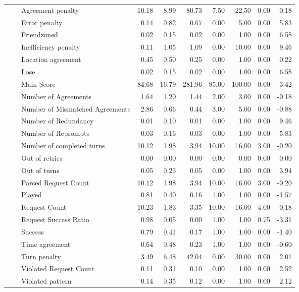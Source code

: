 \begin{tabular}{lllrrrrrrr}
 &  & Agreement penalty & 10.18 & 8.99 & 80.73 & 7.50 & 22.50 & 0.00 & 0.18 \\
 &  & Error penalty & 0.14 & 0.82 & 0.67 & 0.00 & 5.00 & 0.00 & 5.83 \\
 &  & Friendzoned & 0.02 & 0.15 & 0.02 & 0.00 & 1.00 & 0.00 & 6.58 \\
 &  & Inefficiency penalty & 0.11 & 1.05 & 1.09 & 0.00 & 10.00 & 0.00 & 9.46 \\
 &  & Location agreement & 0.45 & 0.50 & 0.25 & 0.00 & 1.00 & 0.00 & 0.22 \\
 &  & Lose & 0.02 & 0.15 & 0.02 & 0.00 & 1.00 & 0.00 & 6.58 \\
 &  & Main Score & 84.68 & 16.79 & 281.96 & 85.00 & 100.00 & 0.00 & -3.42 \\
 &  & Number of Agreements & 1.64 & 1.20 & 1.44 & 2.00 & 3.00 & 0.00 & -0.18 \\
 &  & Number of Mismatched Agreements & 2.86 & 0.66 & 0.44 & 3.00 & 5.00 & 0.00 & -0.88 \\
 &  & Number of Redundancy & 0.01 & 0.10 & 0.01 & 0.00 & 1.00 & 0.00 & 9.46 \\
 &  & Number of Reprompts & 0.03 & 0.16 & 0.03 & 0.00 & 1.00 & 0.00 & 5.83 \\
 &  & Number of completed turns & 10.12 & 1.98 & 3.94 & 10.00 & 16.00 & 3.00 & -0.20 \\
 &  & Out of retries & 0.00 & 0.00 & 0.00 & 0.00 & 0.00 & 0.00 & 0.00 \\
 &  & Out of turns & 0.05 & 0.23 & 0.05 & 0.00 & 1.00 & 0.00 & 3.94 \\
 &  & Parsed Request Count & 10.12 & 1.98 & 3.94 & 10.00 & 16.00 & 3.00 & -0.20 \\
 &  & Played & 0.81 & 0.40 & 0.16 & 1.00 & 1.00 & 0.00 & -1.57 \\
 &  & Request Count & 10.23 & 1.83 & 3.35 & 10.00 & 16.00 & 4.00 & 0.18 \\
 &  & Request Success Ratio & 0.98 & 0.05 & 0.00 & 1.00 & 1.00 & 0.75 & -3.31 \\
 &  & Success & 0.79 & 0.41 & 0.17 & 1.00 & 1.00 & 0.00 & -1.40 \\
 &  & Time agreement & 0.64 & 0.48 & 0.23 & 1.00 & 1.00 & 0.00 & -0.60 \\
 &  & Turn penalty & 3.49 & 6.48 & 42.04 & 0.00 & 30.00 & 0.00 & 2.01 \\
 &  & Violated Request Count & 0.11 & 0.31 & 0.10 & 0.00 & 1.00 & 0.00 & 2.52 \\
 &  & Violated pattern & 0.14 & 0.35 & 0.12 & 0.00 & 1.00 & 0.00 & 2.12 \\

\end{tabular}
